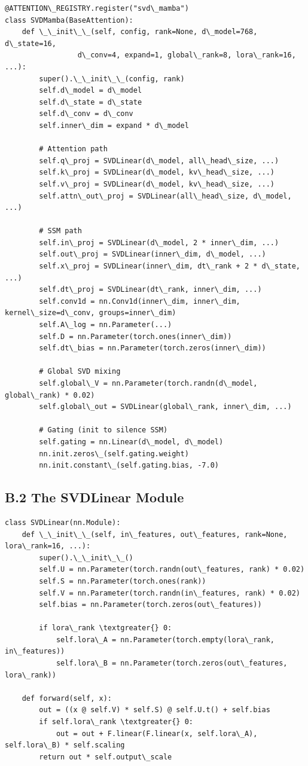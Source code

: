 \begin{lstlisting}
@ATTENTION\_REGISTRY.register("svd\_mamba")
class SVDMamba(BaseAttention):
    def \_\_init\_\_(self, config, rank=None, d\_model=768, d\_state=16,
                 d\_conv=4, expand=1, global\_rank=8, lora\_rank=16, ...):
        super().\_\_init\_\_(config, rank)
        self.d\_model = d\_model
        self.d\_state = d\_state
        self.d\_conv = d\_conv
        self.inner\_dim = expand * d\_model
        
        # Attention path
        self.q\_proj = SVDLinear(d\_model, all\_head\_size, ...)
        self.k\_proj = SVDLinear(d\_model, kv\_head\_size, ...)
        self.v\_proj = SVDLinear(d\_model, kv\_head\_size, ...)
        self.attn\_out\_proj = SVDLinear(all\_head\_size, d\_model, ...)
        
        # SSM path
        self.in\_proj = SVDLinear(d\_model, 2 * inner\_dim, ...)
        self.out\_proj = SVDLinear(inner\_dim, d\_model, ...)
        self.x\_proj = SVDLinear(inner\_dim, dt\_rank + 2 * d\_state, ...)
        self.dt\_proj = SVDLinear(dt\_rank, inner\_dim, ...)
        self.conv1d = nn.Conv1d(inner\_dim, inner\_dim, kernel\_size=d\_conv, groups=inner\_dim)
        self.A\_log = nn.Parameter(...)
        self.D = nn.Parameter(torch.ones(inner\_dim))
        self.dt\_bias = nn.Parameter(torch.zeros(inner\_dim))
        
        # Global SVD mixing
        self.global\_V = nn.Parameter(torch.randn(d\_model, global\_rank) * 0.02)
        self.global\_out = SVDLinear(global\_rank, inner\_dim, ...)
        
        # Gating (init to silence SSM)
        self.gating = nn.Linear(d\_model, d\_model)
        nn.init.zeros\_(self.gating.weight)
        nn.init.constant\_(self.gating.bias, -7.0)
\end{lstlisting}

\subsection{B.2 The SVDLinear Module}

\begin{lstlisting}
class SVDLinear(nn.Module):
    def \_\_init\_\_(self, in\_features, out\_features, rank=None, lora\_rank=16, ...):
        super().\_\_init\_\_()
        self.U = nn.Parameter(torch.randn(out\_features, rank) * 0.02)
        self.S = nn.Parameter(torch.ones(rank))
        self.V = nn.Parameter(torch.randn(in\_features, rank) * 0.02)
        self.bias = nn.Parameter(torch.zeros(out\_features))
        
        if lora\_rank \textgreater{} 0:
            self.lora\_A = nn.Parameter(torch.empty(lora\_rank, in\_features))
            self.lora\_B = nn.Parameter(torch.zeros(out\_features, lora\_rank))
    
    def forward(self, x):
        out = ((x @ self.V) * self.S) @ self.U.t() + self.bias
        if self.lora\_rank \textgreater{} 0:
            out = out + F.linear(F.linear(x, self.lora\_A), self.lora\_B) * self.scaling
        return out * self.output\_scale
\end{lstlisting}

